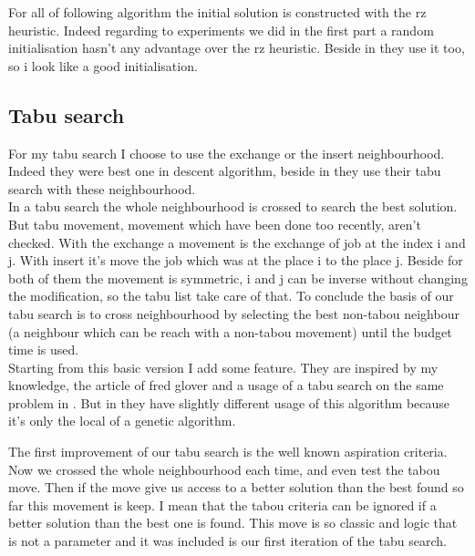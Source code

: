 \documentclass[12pt,a4paper]{article}
\begin{document}
For all of following algorithm the initial solution is constructed with the rz heuristic. Indeed regarding to experiments we did in the first part a random initialisation hasn't any advantage over the rz heuristic. Beside in \cite{Pan201231} they use it too, so i look like a good initialisation.

\subsection{Tabu search}

For my tabu search I choose to use the exchange or the insert neighbourhood. Indeed they were best one in descent algorithm, beside in \cite{Tseng2010121} they use their tabu search with these neighbourhood.\\

In a tabu search the whole neighbourhood is crossed to search the best solution. But tabu movement, movement which have been done too recently, aren't checked. With the exchange a movement is the exchange of job at the index i and j. With insert it's move the job which was at the place i to the place j. Beside for both of them the movement is symmetric, i and j can be inverse without changing the modification, so the tabu list take care of that. To conclude the basis of our tabu search is to cross neighbourhood by selecting the best non-tabou neighbour (a neighbour which can be reach with a non-tabou movement) until the budget time is used.\\

Starting from this basic version I add some feature. They are inspired by my knowledge, the article of fred glover \cite{tabuprinciple} and a usage of a tabu search on the same problem in \cite{Tseng2010121}. But in \cite{Tseng2010121} they have slightly different usage of this algorithm because it's only the local of a genetic algorithm.

The first improvement of our tabu search is the well known aspiration criteria. Now we crossed the whole neighbourhood each time, and even test the tabou move. Then if the move give us access to a better solution than the best found so far this movement is keep. I mean that the tabou criteria can be ignored if a better solution than the best one is found. This move is so classic and logic that is not a parameter and it was included is our first iteration of the tabu search.
\end{document}
